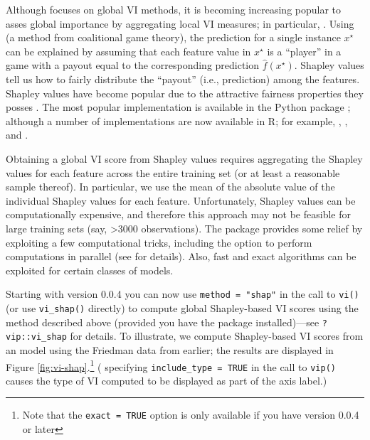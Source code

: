 Although  focuses on global VI methods, it is becoming
increasing popular to asses global importance by aggregating local VI
measures; in particular, 
\citep{strumbelj-2014-explaining}. Using  (a method
from coalitional game theory), the prediction for a single instance
\(x^\star\) can be explained by assuming that each feature value in
\(x^\star\) is a ``player'' in a game with a payout equal to the
corresponding prediction \(\widehat{f}\left(x^\star\right)\). Shapley
values tell us how to fairly distribute the ``payout'' (i.e.,
prediction) among the features. Shapley values have become popular due
to the attractive fairness properties they posses
\citep{lundberg_unified_2017}. The most popular implementation is
available in the Python  package
\citep{lundberg_unified_2017}; although a number of implementations are
now available in R; for example, , 
\citep{R-iBreakDown}, and  \citep{R-fastshap}.

Obtaining a global VI score from Shapley values requires aggregating the
Shapley values for each feature across the entire training set (or at
least a reasonable sample thereof). In particular, we use the mean of
the absolute value of the individual Shapley values for each feature.
Unfortunately, Shapley values can be computationally expensive, and
therefore this approach may not be feasible for large training sets
(say, \textgreater{}3000 observations). The  package
provides some relief by exploiting a few computational tricks, including
the option to perform computations in parallel (see
 for details). Also, fast and exact algorithms
\citep{lundberg-explainable-2019} can be exploited for certain classes
of models.

Starting with  version 0.0.4 you can now use
\texttt{method\ =\ "shap"} in the call to \texttt{vi()} (or use
\texttt{vi\_shap()} directly) to compute global Shapley-based VI scores
using the method described above (provided you have the 
package installed)---see \texttt{?vip::vi\_shap} for details. To
illustrate, we compute Shapley-based VI scores from an 
model \citep{R-xgboost} using the Friedman data from earlier; the
results are displayed in Figure \ref{fig:vi-shap}.\footnote{Note that
  the \texttt{exact\ =\ TRUE} option is only available if you have
   version 0.0.4 or later} ( specifying
\texttt{include\_type\ =\ TRUE} in the call to \texttt{vip()} causes the
type of VI computed to be displayed as part of the axis label.)

